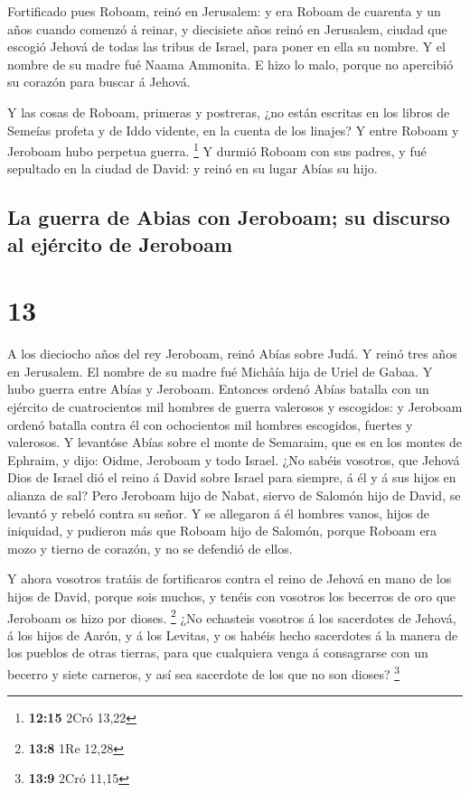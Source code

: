  Fortificado pues Roboam, reinó en Jerusalem: y era
Roboam de cuarenta y un años cuando comenzó á reinar, y diecisiete años
reinó en Jerusalem, ciudad que escogió Jehová de todas las tribus de
Israel, para poner en ella su nombre. Y el nombre de su madre fué Naama
Ammonita.  E hizo lo malo, porque no apercibió su corazón
para buscar á Jehová.

 Y las cosas de Roboam, primeras y postreras, ¿no están
escritas en los libros de Semeías profeta y de Iddo vidente, en la
cuenta de los linajes? Y entre Roboam y Jeroboam hubo perpetua guerra.
\footnote{\textbf{12:15} 2Cró 13,22}  Y durmió Roboam con
sus padres, y fué sepultado en la ciudad de David: y reinó en su lugar
Abías su hijo.

\hypertarget{la-guerra-de-abias-con-jeroboam-su-discurso-al-ejuxe9rcito-de-jeroboam}{%
\subsection{La guerra de Abias con Jeroboam; su discurso al ejército de
Jeroboam}\label{la-guerra-de-abias-con-jeroboam-su-discurso-al-ejuxe9rcito-de-jeroboam}}

\hypertarget{section-12}{%
\section{13}\label{section-12}}

 A los dieciocho años del rey Jeroboam, reinó Abías sobre
Judá.  Y reinó tres años en Jerusalem. El nombre de su
madre fué Michâía hija de Uriel de Gabaa. Y hubo guerra entre Abías y
Jeroboam.  Entonces ordenó Abías batalla con un ejército
de cuatrocientos mil hombres de guerra valerosos y escogidos: y Jeroboam
ordenó batalla contra él con ochocientos mil hombres escogidos, fuertes
y valerosos.  Y levantóse Abías sobre el monte de
Semaraim, que es en los montes de Ephraim, y dijo: Oidme, Jeroboam y
todo Israel.  ¿No sabéis vosotros, que Jehová Dios de
Israel dió el reino á David sobre Israel para siempre, á él y á sus
hijos en alianza de sal?  Pero Jeroboam hijo de Nabat,
siervo de Salomón hijo de David, se levantó y rebeló contra su señor.
 Y se allegaron á él hombres vanos, hijos de iniquidad, y
pudieron más que Roboam hijo de Salomón, porque Roboam era mozo y tierno
de corazón, y no se defendió de ellos.

 Y ahora vosotros tratáis de fortificaros contra el reino
de Jehová en mano de los hijos de David, porque sois muchos, y tenéis
con vosotros los becerros de oro que Jeroboam os hizo por dioses.
\footnote{\textbf{13:8} 1Re 12,28}  ¿No echasteis vosotros
á los sacerdotes de Jehová, á los hijos de Aarón, y á los Levitas, y os
habéis hecho sacerdotes á la manera de los pueblos de otras tierras,
para que cualquiera venga á consagrarse con un becerro y siete carneros,
y así sea sacerdote de los que no son dioses? \footnote{\textbf{13:9}
  2Cró 11,15}

